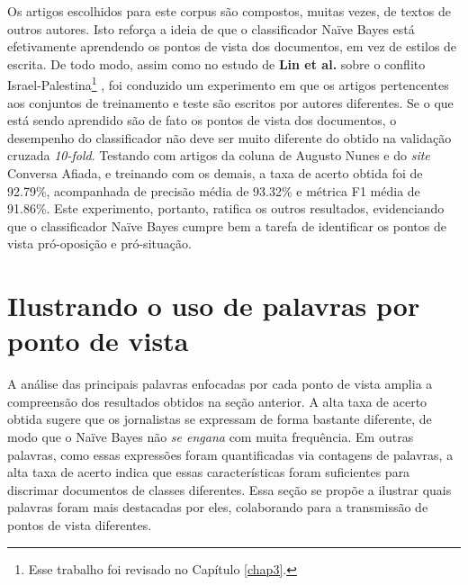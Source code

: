 Os artigos escolhidos para este corpus são compostos, muitas vezes, de textos de outros autores. Isto reforça a ideia de que o classificador Naïve Bayes está efetivamente aprendendo os pontos de vista dos documentos, em vez de estilos de escrita. De todo modo, assim como no estudo de \textbf{Lin et al.} sobre o conflito Israel-Palestina\footnote{Esse trabalho foi revisado no Capítulo \ref{chap3}.} \cite{lin-et-al2006}, foi conduzido um experimento em que os artigos pertencentes aos conjuntos de treinamento e teste são escritos por autores diferentes. Se o que está sendo aprendido são de fato os pontos de vista dos documentos, o desempenho do classificador não deve ser muito diferente do obtido na validação cruzada \emph{10-fold}. Testando com artigos da coluna de Augusto Nunes e do \emph{site} Conversa Afiada, e treinando com os demais, a taxa de acerto obtida foi de 92.79\%, acompanhada de precisão média de 93.32\% e métrica F1 média de 91.86\%. Este experimento, portanto, ratifica os outros resultados, evidenciando que o classificador Naïve Bayes cumpre bem a tarefa de identificar os pontos de vista pró-oposição e pró-situação.






\section{Ilustrando o uso de palavras por ponto de vista}
\label{estudo:sec3}

A análise das principais palavras enfocadas por cada ponto de vista amplia a compreensão dos resultados obtidos na seção anterior. A alta taxa de acerto obtida sugere que os jornalistas se expressam de forma bastante diferente, de modo que o Naïve Bayes não \emph{se engana} com muita frequência. Em outras palavras, como essas expressões foram quantificadas via contagens de palavras, a alta taxa de acerto indica que essas características foram suficientes para discrimar documentos de classes diferentes. Essa seção se propõe a ilustrar quais palavras foram mais destacadas por eles, colaborando para a transmissão de pontos de vista diferentes.

